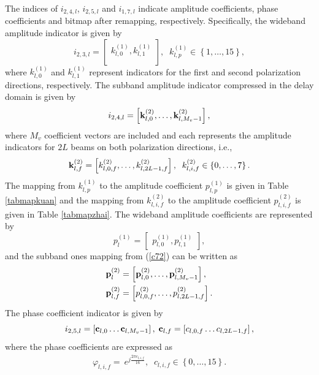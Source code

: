 \documentclass[lettersize,journal]{IEEEtran}
\begin{document}
The indices of $i_{2,4,l}$, $i_{2,5,l}$ and $i_{1,7,l}$ indicate amplitude coefficients, phase coefficients and bitmap after remapping, respectively. Specifically, the wideband amplitude indicator is given by 
\begin{equation}
i_{2,3,l}=\left[\begin{matrix}k_{l,0}^{\left(1\right)},k_{l,1}^{\left(1\right)}\\\end{matrix}\right], \;\;k_{l,p}^{(1)}\in\left\{1,\ldots,15\right\},
\end{equation}
where $k_{l,0}^{\left(1\right)}$ and $k_{l,1}^{\left(1\right)}$ represent indicators for the first and second polarization directions, respectively. The subband amplitude indicator compressed in the delay domain is given by
\begin{equation}\label{c72}
    i_{2,4,l}=\left[{\bf{k}}_{l,0}^{(2)},\ldots ,{\bf{k}}_{l,M_v-1}^{(2)}\right],
\end{equation}
where $M_v$ coefficient vectors are included and each represents the amplitude indicators for $2L$ beams on both polarization directions, i.e.,
\begin{equation}
{\bf{k}}_{l,f}^{(2)}=\left[k_{l,0,f}^{(2)},\ldots, k_{l,2L-1,f}^{(2)}\right], \;\;k_{l,i,f}^{(2)}\in\left\{0,\ldots,7\right\}.
\end{equation}
The mapping from $k_{l,p}^{(1)}$ to the amplitude coefficient $p_{l,p}^{(1)}$ is given in Table \ref{tabmapkuan} and the mapping from $k_{l,i,f}^{(2)}$ to the amplitude coefficient $p_{l,i,f}^{(2)}$ is given in Table \ref{tabmapzhai}. The wideband amplitude coefficients are represented by 
\begin{equation}
p_l^{\left( 1 \right)} = \left[ {\begin{aligned}
{p_{l,0}^{\left( 1 \right)}},{p_{l,1}^{\left( 1 \right)}}
\end{aligned}} \right],   
\end{equation}
and the subband ones mapping from (\ref{c72}) can be written as
\begin{equation}
\begin{aligned}
{\bf{p}}_l^{(2)} &= \left[ {{\bf{p}}_{l,0}^{(2)}, \ldots ,{\bf{p}}_{l,{M_v } - 1}^{(2)}} \right],\\
{\bf{p}}_{l,f}^{(2)} &= \left[ {p_{l,0,f}^{(2)}, \ldots ,p_{l,2L - 1,f}^{(2)}} \right].
\end{aligned}
\end{equation}
The phase coefficient indicator is given by 
\begin{equation}
 {i_{2,5,l}} = \left[ {{{\bf{c}}_{l,0}} \ldots {{\bf{c}}_{l,{M_v } - 1}}} \right], \; {{\bf{c}}_{l,f}} = \left[ {{c_{l,0,f}} \ldots {c_{l,2L - 1,f}}} \right],  
\end{equation}
where the phase coefficients are expressed as 
\begin{equation}
\begin{aligned}
\varphi_{l,i,f}=\ e^{j\frac{2\pi c_{l,i,f}}{16}},\;\;{c_{l,i,f}} \in \left\{ {0, \ldots ,15} \right\}.
\end{aligned}
\end{equation}
\end{document}
